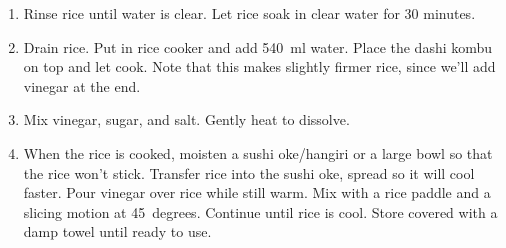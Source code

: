 
\begin{ingredients}
\end{ingredients}


\begin{recipe}
  \begin{enumerate}

  \item Rinse rice until water is clear.  Let rice soak in clear water for 30 minutes.
    
  \item Drain rice.  Put in rice cooker and add 540~ml water.  Place
    the dashi kombu on top and let cook.  Note that this makes
    slightly firmer rice, since we'll add vinegar at the end.

  \item Mix vinegar, sugar, and salt.  Gently heat to dissolve.
    
  \item When the rice is cooked, moisten a sushi oke/hangiri or a
    large bowl so that the rice won't stick.  Transfer rice into the
    sushi oke, spread so it will cool faster.  Pour vinegar over rice
    while still warm.  Mix with a rice paddle and a slicing motion at
    45~degrees.  Continue until rice is cool.  Store covered with a
    damp towel until ready to use.

  \end{enumerate}
\end{recipe}

